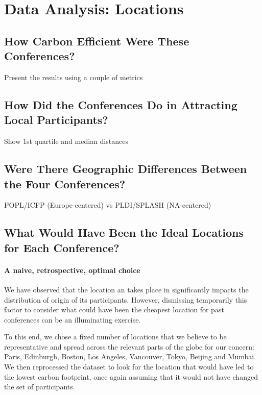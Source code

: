 \section{Data Analysis: Locations}

\subsection{How Carbon Efficient Were These Conferences?}

Present the results using a couple of metrics

\subsection{How Did the Conferences Do in Attracting Local Participants?}

Show 1st quartile and median distances

\subsection{Were There Geographic Differences Between the Four Conferences?}

POPL/ICFP (Europe-centered) vs PLDI/SPLASH (NA-centered)

\subsection{What Would Have Been the Ideal Locations for Each Conference?}


\paragraph{A naive, retrospective, optimal choice}

We have observed that the location an \event takes place in significantly
impacts the distribution of origin of its participants. However, dismissing
temporarily this factor to consider what could have been the cheapest location
for past conferences can be an illuminating exercise.

To this end, we chose a fixed number of locations that we believe to be
representative and spread across the relevant parts of the globe for our
concern: Paris, Edinburgh, Boston, Los Angeles, Vancouver, Tokyo, Beijing and
Mumbai. We then reprocessed the dataset to look for the location that would have
led to the lowest carbon footprint, once again assuming that it would not have
changed the set of participants.

